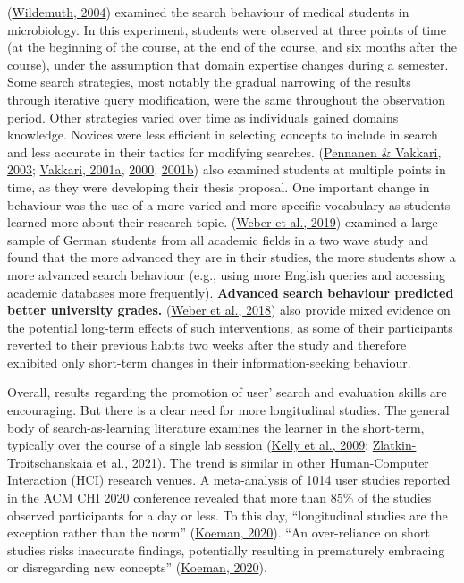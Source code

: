 \documentclass[a4paper, nobind]{templates/ociamthesis}
\begin{document}
(\protect\hyperlink{ref-wildemuth2004effects}{Wildemuth, 2004}) examined the search behaviour of medical
students in microbiology. In this experiment, students were observed at
three points of time (at the beginning of the course, at the end of the
course, and six months after the course), under the assumption that
domain expertise changes during a semester. Some search strategies, most
notably the gradual narrowing of the results through iterative query
modification, were the same throughout the observation period. Other
strategies varied over time as individuals gained domains knowledge.
Novices were less efficient in selecting concepts to include in search
and less accurate in their tactics for modifying searches.
(\protect\hyperlink{ref-pennanen2003students}{Pennanen \& Vakkari, 2003}; \protect\hyperlink{ref-vakkari2001theory}{Vakkari, 2001a}, \protect\hyperlink{ref-vakkari2000cognition}{2000}, \protect\hyperlink{ref-vakkari2001changes}{2001b})
also examined students at multiple points in time, as they were
developing their thesis proposal. One important change in behaviour was
the use of a more varied and more specific vocabulary as students
learned more about their research topic. (\protect\hyperlink{ref-weber2019informationseeking}{Weber et al., 2019})
examined a large sample of German students from all academic fields in a
two wave study and found that the more advanced they are in their
studies, the more students show a more advanced search behaviour (e.g.,
using more English queries and accessing academic databases more
frequently). \textbf{Advanced search behaviour predicted better university
grades.} (\protect\hyperlink{ref-weber2018can}{Weber et al., 2018}) also provide mixed evidence on the potential
long-term effects of such interventions, as some of their participants
reverted to their previous habits two weeks after the study and
therefore exhibited only short-term changes in their information-seeking
behaviour.

Overall, results regarding the promotion of user' search and evaluation
skills are encouraging. But there is a clear need for more longitudinal
studies. The general body of search-as-learning literature examines the
learner in the short-term, typically over the course of a single lab
session (\protect\hyperlink{ref-kelly2009evaluation}{Kelly et al., 2009}; \protect\hyperlink{ref-zlatkin2021students}{Zlatkin-Troitschanskaia et al., 2021}). The trend is
similar in other Human-Computer Interaction (HCI) research venues. A
meta-analysis of 1014 user studies reported in the ACM CHI 2020
conference revealed that more than 85\% of the studies observed
participants for a day or less. To this day, ``longitudinal studies are
the exception rather than the norm'' (\protect\hyperlink{ref-HCIUXres81_online}{Koeman, 2020}). ``An
over-reliance on short studies risks inaccurate findings, potentially
resulting in prematurely embracing or disregarding new concepts''
(\protect\hyperlink{ref-HCIUXres81_online}{Koeman, 2020}).
\end{document}
